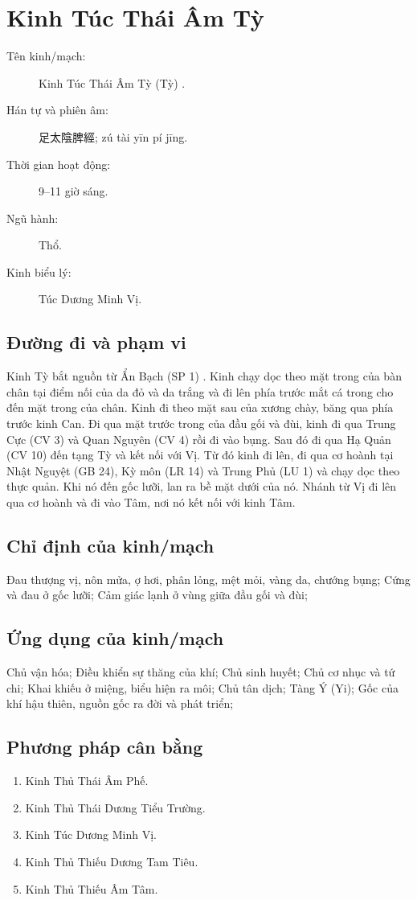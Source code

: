 \documentclass[12pt,a4paper]{article}
\begin{document}
\section{Kinh Túc Thái Âm Tỳ}
\begin{description}
\item[Tên kinh/mạch:] Kinh Túc Thái Âm Tỳ (Tỳ) .
\item[Hán tự và phiên âm:] 足太陰脾經; zú tài yīn pí jīng.
\item[Thời gian hoạt động:] 9--11 giờ sáng.
\item[Ngũ hành:] Thổ.
\item[Kinh biểu lý:] Túc Dương Minh Vị.
\end{description}
\subsection*{Đường đi và phạm vi}Kinh Tỳ bắt nguồn từ Ẩn Bạch (SP 1) . Kinh chạy dọc theo mặt trong của bàn chân tại điểm nối của da đỏ và da trắng và đi lên phía trước mắt cá trong cho đến mặt trong của chân. Kinh đi theo mặt sau của xương chày, băng qua phía trước kinh Can. Đi qua mặt trước trong của đầu gối và đùi, kinh đi qua Trung Cực (CV 3) và Quan Nguyên (CV 4) rồi đi vào bụng. Sau đó đi qua Hạ Quản (CV 10) đến tạng Tỳ và kết nối với Vị. Từ đó kinh đi lên, đi qua cơ hoành tại Nhật Nguyệt (GB 24), Kỳ môn (LR 14) và Trung Phủ (LU 1) và chạy dọc theo thực quản. Khi nó đến gốc lưỡi, lan ra bề mặt dưới của nó. Nhánh từ Vị đi lên qua cơ hoành và đi vào Tâm, nơi nó kết nối với kinh Tâm.
\subsection*{Chỉ định của kinh/mạch}Đau thượng vị, nôn mửa, ợ hơi, phân lỏng, mệt mỏi, vàng da, chướng bụng; Cứng và đau ở gốc lưỡi; Cảm giác lạnh ở vùng giữa đầu gối và đùi;
\subsection*{Ứng dụng của kinh/mạch}Chủ vận hóa; Điều khiển sự thăng của khí; Chủ sinh huyết; Chủ cơ nhục và tứ chi; Khai khiếu ở miệng, biểu hiện ra môi; Chủ tân dịch; Tàng Ý (Yi); Gốc của khí hậu thiên, nguồn gốc ra đời và phát triển;
\subsection*{Phương pháp cân bằng}
\begin{enumerate}
\item Kinh Thủ Thái Âm Phế.
\item Kinh Thủ Thái Dương Tiểu Trường.
\item Kinh Túc Dương Minh Vị.
\item Kinh Thủ Thiếu Dương Tam Tiêu.
\item Kinh Thủ Thiếu Âm Tâm.
\end{enumerate}
\end{document}
